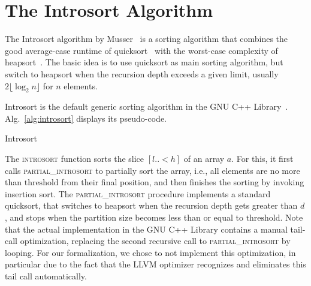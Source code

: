 \documentclass[sigplan,10pt,anonymous,review]{acmart}\settopmatter{printfolios=true,printccs=false,printacmref=false}
\theoremstyle{definition}
\begin{document}
\section{The Introsort Algorithm}
  The Introsort algorithm by Musser~\cite{Muss97} is a sorting algorithm
  that combines the good average-case runtime of quicksort~\cite{Hoare61} with the worst-case complexity of heapsort~\cite{Will64}.
  The basic idea is to use quicksort as main sorting algorithm, but switch to heapsort when the recursion
  depth exceeds a given limit, usually $2\lfloor\log_2 n\rfloor$ for $n$ elements.

  Introsort is the default generic sorting algorithm in the GNU C++ Library~\cite{libstdc++}. Alg.~\ref{alg:introsort} displays its pseudo-code.
  \begin{algorithm}
  \begin{algorithmic}[1]
        \Else
        \EndIf
      \EndIf
    \EndProcedure

      \EndIf
    \EndProcedure
  \end{algorithmic}
  \caption{Introsort}\label{alg:introsort}
  \end{algorithm}
  The \textsc{introsort} function sorts the slice $[l{..}{<}h]$ of an array $a$. For this, it first
  calls \textsc{partial\_introsort} to partially sort the array, i.e., all elements are no more than $\textrm{threshold}$ from their final position,
  and then finishes the sorting by invoking insertion sort. The \textsc{partial\_introsort} procedure implements a standard quicksort, that switches
  to heapsort when the recursion depth gets greater than $d$, and stops when the partition size becomes less than or equal to $\textrm{threshold}$.
  Note that the actual implementation in the GNU C++ Library contains a manual tail-call optimization,
  replacing the second recursive call to \textsc{partial\_introsort} by looping. For our formalization, we chose to not implement this
  optimization, in particular due to the fact that the LLVM optimizer recognizes and eliminates this tail call automatically.
\end{document}
